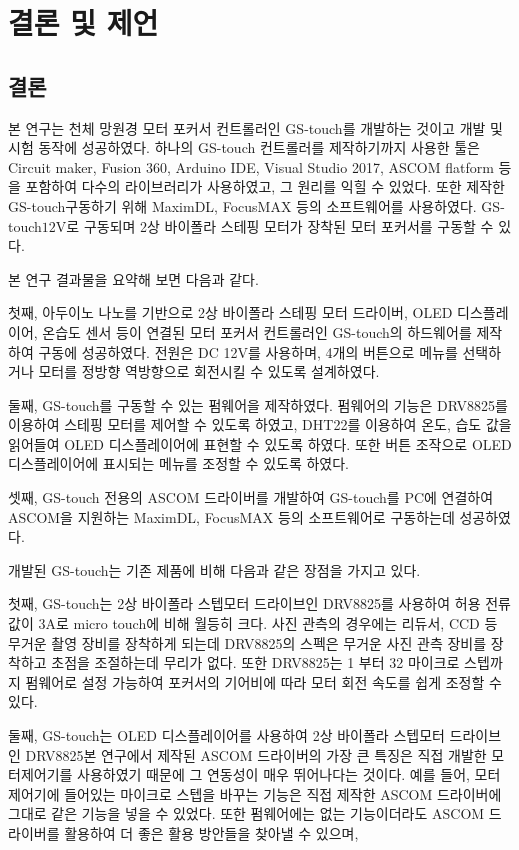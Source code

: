 \section{결론 및 제언}

\subsection{결론}
	
본 연구는 천체 망원경 모터 포커서 컨트롤러인 GS-touch를 개발하는 것이고 개발 및 시험 동작에 성공하였다. 하나의 GS-touch 컨트롤러를 제작하기까지 사용한 툴은 Circuit maker, Fusion 360, Arduino IDE, Visual Studio 2017, ASCOM flatform 등을 포함하여 다수의 라이브러리가 사용하였고, 그 원리를 익힐 수 있었다. 또한 제작한 GS-touch\를 구동하기 위해 MaximDL, FocusMAX 등의 소프트웨어를 사용하였다. GS-touch\는 $12 \textrm{V}$로 구동되며 2상 바이폴라 스테핑 모터가 장착된 모터 포커서를 구동할 수 있다. 

본 연구 결과물을 요약해 보면 다음과 같다. 

첫째, 아두이노 나노를 기반으로 2상 바이폴라 스테핑 모터 드라이버, OLED 디스플레이어, 온습도 센서 등이 연결된 모터 포커서 컨트롤러인 GS-touch의 하드웨어를 제작하여 구동에 성공하였다. 전원은 DC 12V를 사용하며, 4개의 버튼으로 메뉴를 선택하거나 모터를 정방향 역방향으로 회전시킬 수 있도록 설계하였다.

둘째, GS-touch를 구동할 수 있는 펌웨어을 제작하였다. 펌웨어의 기능은 DRV8825를 이용하여 스테핑 모터를 제어할 수 있도록 하였고, DHT22를 이용하여 온도, 습도 값을 읽어들여 OLED 디스플레이어에 표현할 수 있도록 하였다. 또한 버튼 조작으로 OLED 디스플레이어에 표시되는 메뉴를 조정할 수 있도록 하였다. 

셋째, GS-touch 전용의 ASCOM 드라이버를 개발하여 GS-touch를 PC에 연결하여 ASCOM을 지원하는 MaximDL, FocusMAX 등의 소프트웨어로 구동하는데 성공하였다.

개발된 GS-touch는 기존 제품에 비해 다음과 같은 장점을 가지고 있다. 

첫째, GS-touch는 2상 바이폴라 스텝모터 드라이브인 DRV8825를 사용하여 허용 전류 값이 $3 \textrm{A}$로 micro touch에 비해 월등히 크다. 사진 관측의 경우에는 리듀서, CCD 등 무거운 촬영 장비를 장착하게 되는데 DRV8825의 스펙은 무거운 사진 관측 장비를 장착하고 초점을 조절하는데 무리가 없다. 또한 DRV8825는 1 부터 32 마이크로 스텝까지 펌웨어로 설정 가능하여 포커서의 기어비에 따라 모터 회전 속도를 쉽게 조정할 수 있다. 

둘째, GS-touch는 OLED 디스플레이어를 사용하여 2상 바이폴라 스텝모터 드라이브인 DRV8825본 연구에서 제작된 ASCOM 드라이버의 가장 큰 특징은 직접 개발한 모터제어기를 사용하였기 때문에 그 연동성이 매우 뛰어나다는 것이다. 예를 들어, 모터제어기에 들어있는 마이크로 스텝을 바꾸는 기능은 직접 제작한 ASCOM 드라이버에 그대로 같은 기능을 넣을 수 있었다. 또한 펌웨어에는 없는 기능이더라도 ASCOM 드라이버를 활용하여 더 좋은 활용 방안들을 찾아낼 수 있으며, 

